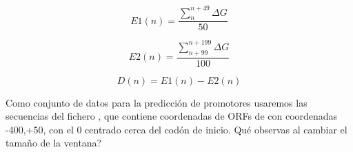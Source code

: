 \begin{equation}
E1(n) = \frac{\sum_{n}^{n+49}\Delta G}{50} 
\end{equation}

\begin{equation}
E2(n) = \frac{\sum_{n+99}^{n+199}\Delta G}{100} 
\end{equation}

\begin{equation}
D(n) = E1(n) - E2(n)
\end{equation}

Como conjunto de datos para la predicci\'{o}n de promotores usaremos las secuencias del fichero , 
que contiene coordenadas de ORFs de  con coordenadas -400,+50, con el 0 centrado cerca del cod\'{o}n de inicio.
Qu\'{e} observas al cambiar el tama\~no de la ventana?

